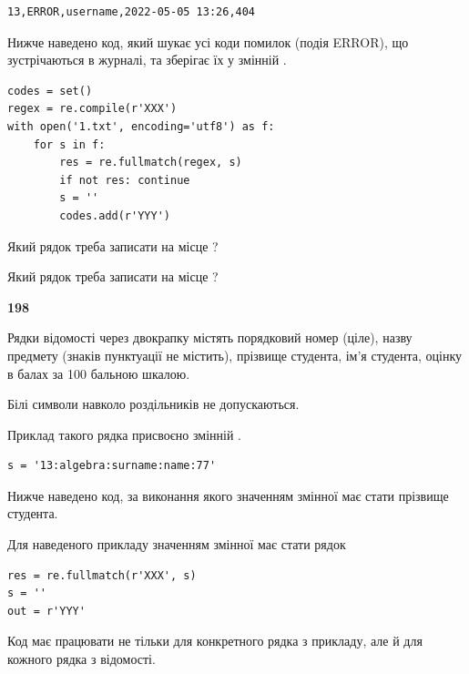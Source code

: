 \begin{verbatim}
13,ERROR,username,2022-05-05 13:26,404
\end{verbatim}


Нижче наведено код, який шукає усі коди помилок (подія ERROR), що зустріча\-ють\-ся в журналі, та зберігає їх у змінній .



\begin{verbatim}
codes = set()
regex = re.compile(r'XXX')
with open('1.txt', encoding='utf8') as f:
    for s in f:
        res = re.fullmatch(regex, s)
        if not res: continue
        s = ''
        codes.add(r'YYY')
\end{verbatim}





Який рядок треба записати на місце  ?\par
\vspace{5mm}


Який рядок треба записати на місце  ?\par


\newpage

{\begin {center}\textbf{ 198}\end {center}}\par
Рядки відомості через двокрапку містять порядковий номер (ціле), назву предмету (знаків пунктуації не містить), прізвище студента, ім'я студента, оцінку в балах за 100 бальною шкалою.

Білі символи навколо роздільників не допускаються.

Приклад такого рядка присвоєно змінній .



\begin{verbatim}
s = '13:algebra:surname:name:77'
\end{verbatim}


Нижче наведено код, за виконання якого значенням змінної  має стати прізвище студента.

Для наведеного прикладу значенням змінної  має стати рядок 



\begin{verbatim}
res = re.fullmatch(r'XXX', s)
s = ''
out = r'YYY'
\end{verbatim}


Код має працювати не тільки для конкретного рядка з прикладу, але й для кожного рядка з відомості.




